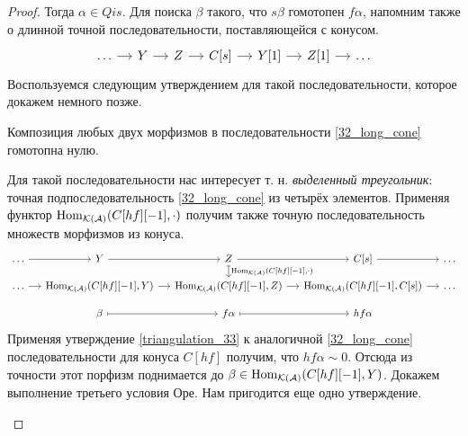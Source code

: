 \documentclass[../hw_main.tex]{subfiles}
\begin{document}
\begin{proof}
Тогда $\alpha \in Qis$. Для поиска $\beta$ такого, что $s\beta$ гомотопен $f\alpha$, напомним также о длинной точной последовательности, поставляющейся с конусом.
    \begin{equation}\label{32_long_cone}
        \begin{tikzcd}[sep=small]
	\ldots&Y&Z& {C[s]} & Y[1]&Z[1]&\ldots
	\arrow[from=1-2, to=1-3]
	\arrow[from=1-3, to=1-4]
 \arrow[from=1-1, to=1-2]
 \arrow[from=1-4, to=1-5]
 \arrow[from=1-5, to=1-6]
 \arrow[from=1-6, to=1-7]
\end{tikzcd}
    \end{equation}
Воспользуемся следующим утверждением для такой последовательности, которое докажем немного позже.

\begin{to_lem}\label{triangulation_33}
Композиция любых двух морфизмов в последовательности \eqref{32_long_cone} гомотопна нулю.
\end{to_lem}
Для такой последовательности нас интересует т. н. \emph{выделенный треугольник}: точная подпоследовательность \eqref{32_long_cone} из четырёх элементов. Применяя функтор $\operatorname{Hom}_{\mathcal{K}(\mathcal{A})}(C[hf][-1], \cdot)$ получим также точную последовательность множеств морфизмов из конуса.
    \begin{equation*}
       \begin{tikzcd}[sep=small]
	\ldots & Y & Z & {C[s]} & \ldots \\
	\ldots & {\Hom_{\mathcal{K}(\mathcal{A})}(C[hf][-1], Y)} & {\Hom_{\mathcal{K}(\mathcal{A})}(C[hf][-1], Z)} & {\Hom_{\mathcal{K}(\mathcal{A})}(C[hf][-1], C[s])} & \ldots \\
	& \beta & f\alpha & hf\alpha
	\arrow[from=1-2, to=1-3]
	\arrow[from=1-3, to=1-4]
	\arrow["{\Hom_{\mathcal{K}(\mathcal{A})}(C[hf][-1], \cdot)}", maps to, from=1-3, to=2-3]
	\arrow[from=2-2, to=2-3]
	\arrow[from=2-3, to=2-4]
	\arrow[maps to, from=3-3, to=3-4]
	\arrow[maps to, from=3-2, to=3-3]
	\arrow[from=1-4, to=1-5]
	\arrow[from=1-1, to=1-2]
	\arrow[from=2-1, to=2-2]
	\arrow[from=2-4, to=2-5]
\end{tikzcd}
    \end{equation*}
Применяя утверждение \ref{triangulation_33} к аналогичной \eqref{32_long_cone} последовательности для конуса $C[hf]$ получим, что $hf\alpha \sim 0$. Отсюда из точности этот порфизм поднимается до $\beta \in \operatorname{Hom}_{\mathcal{K}(\mathcal{A})}(C[hf][-1], Y)$.
Докажем выполнение третьего условия Оре. Нам пригодится еще одно утверждение.
\begin{to_lem}\label{32_additive_loc}

\end{to_lem}
\end{proof}
\end{document}
